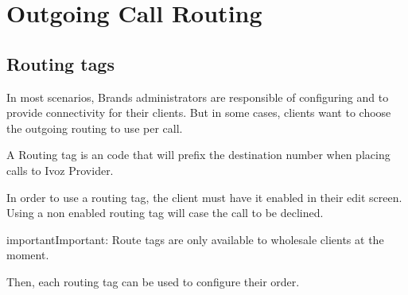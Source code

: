 \documentclass[letterpaper,10pt,english]{sphinxmanual}
\begin{document}
\section{Outgoing Call Routing}
\label{brand/routing/index::doc}\label{brand/routing/index:outgoing-call-routing}

\subsection{Routing tags}
\label{brand/routing/routing_tags:routing-tags}\label{brand/routing/routing_tags::doc}
In most scenarios, Brands administrators are responsible of configuring
{\hyperref[brand/peering/peering_contracts:peering\string-contracts]{}} and {\hyperref[brand/routing/outgoing_routing:outgoing\string-routing]{}} to provide connectivity for
their clients. But in some cases, clients want to choose the outgoing routing to
use per call.

A Routing tag is an code that will prefix the destination number when placing calls to Ivoz Provider.


In order to use a routing tag, the client must have it enabled in their edit screen.
Using a non enabled routing tag will case the call to be declined.


\begin{notice}{important}{Important:}
Route tags are only available to wholesale clients at the moment.
\end{notice}

Then, each routing tag can be used to configure their {\hyperref[brand/routing/outgoing_routing:outgoing\string-routing]{}} order.

\end{document}
